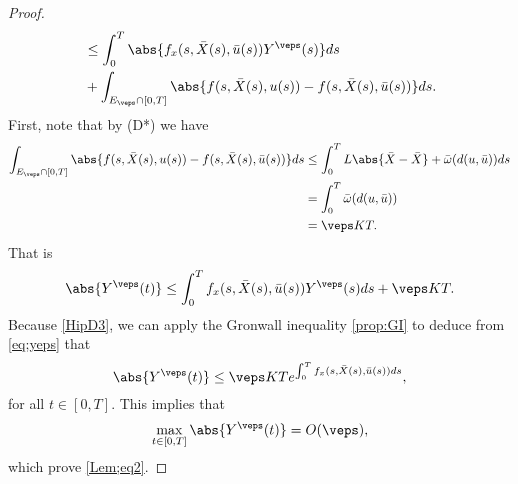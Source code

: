 \begin{proof}
\begin{align*}
        &\leq \int_{0}^{T} \abs{f_{x}(s, \Bar{X}(s), \Bar{u}(s)) Y^{\veps}(s)} ds \\
        &+ \int_{E_{\veps}\cap[0,T]} \abs{f(s, \Bar{X}(s), u(s)) - f(s, \Bar{X}(s), \Bar{u}(s))}ds.
    \end{align*}
    First, note that by (D*) we have
    \begin{align*}
        \int_{E_{\veps}\cap [0,T]} \abs{f(s, \Bar{X}(s), u(s)) - %
            f(s, \Bar{X}(s),\Bar{u}(s))}ds 
        &\leq \int_{0}^{T} L\abs{\Bar{X}-\Bar{X}} + \Bar{\omega}(d(u,\Bar{u}))ds \\
        &= \int_{0}^{T}\Bar{\omega}(d(u,\Bar{u})) \\
        &= \veps KT.
    \end{align*}
    That is
    \begin{equation}\label{eq;yeps}
        \abs{Y^{\veps}(t)} \leq \int_{0}^{T} f_x(s,\Bar{X}(s),\Bar{u}(s))Y^{\veps}(s)ds %
        + \veps KT.
    \end{equation}
    Because \cref{HipD3}, we can apply the Gronwall inequality \eqref{prop:GI} to deduce from \cref{eq;yeps}
    that 
    \begin{equation}
        \abs{Y^{\veps}(t)} \leq \veps KT e^{\int_{0}^{T} f_x(s,\Bar{X}(s),\Bar{u}(s))ds},
    \end{equation}
    for all $t \in [0,T]$. This implies that
    \begin{equation*}
        \max_{t\in[0,T]} \abs{Y^{\veps}(t)} = O(\veps),
    \end{equation*}
    which prove \cref{Lem;eq2}. 
    

\end{proof}
